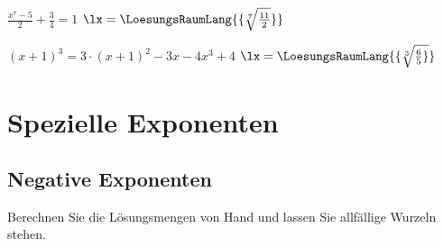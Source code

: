 \begin{bbwAufgabenBlock}
\item
 $\frac{x^7-5}{2} + \frac34 = 1$ \hspace{10mm} $\lx=\LoesungsRaumLang{\{\sqrt[7]{\frac{11}2}\}}$

\item
 $(x+1)^3 = 3\cdot{}(x+1)^2 - 3x - 4x^3 + 4$ \hspace{10mm} $\lx=\LoesungsRaumLang{\{\sqrt[3]{\frac65\}}}$

\end{bbwAufgabenBlock}
\newpage

\section{Spezielle Exponenten}
\subsection{Negative Exponenten}

Berechnen Sie die Lösungsmengen von Hand und lassen Sie allfällige
Wurzeln stehen.


